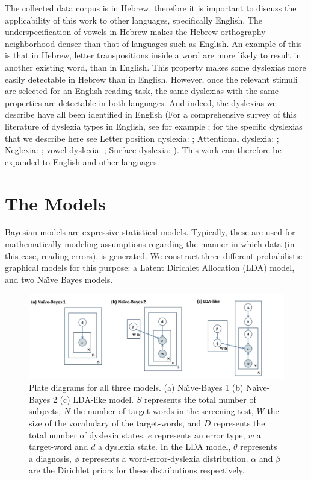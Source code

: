 The collected data corpus is in Hebrew, therefore it is important to discuss the applicability of this work to other languages, specifically English. The underspecification of vowels in Hebrew makes the Hebrew orthography neighborhood denser than that of languages such as English. An example of this is that in Hebrew, letter transpositions inside a word are more likely to result in another existing word, than in English. This property makes some dyslexias more easily detectable in Hebrew than in English. However, once the relevant stimuli are selected for an English reading task, the same dyslexias with the same properties are detectable in both languages. And indeed, the dyslexias we describe have all been identified in English (For a comprehensive survey of this literature of dyslexia types in English, see for example \citealp{ck12}; for the specific dyslexias that we describe here see Letter position dyslexia: \citealp{ck12}; Attentional dyslexia: \citealp{sc98, sw77}; Neglexia: \citealp{vba10}; vowel dyslexia: \citealp{kf11}; Surface dyslexia: \citealp{bd95, cbc06, cc93, c83}). This work can therefore be expanded to English and other languages.  

\section{The Models}
Bayesian models are expressive statistical models. Typically, these are used for mathematically modeling assumptions regarding the manner in which data (in this case, reading errors), is generated. We construct three different probabilistic graphical models for this purpose: a Latent Dirichlet Allocation (LDA) model, and two Na\"{\i}ve Bayes models.

\vfill

\begin{figure}
\vspace{.3in}
\includegraphics[width=\textwidth]{Figures/Ch1/figure_graphical_models}
\caption{Plate diagrams for all three models. (a) Na\"{\i}ve-Bayes 1 (b) Na\"{\i}ve-Bayes 2 (c) LDA-like model. $S$ represents the total number of subjects, $N$ the number of target-words in the screening test, $W$ the size of the vocabulary of the target-words, and $D$ represents the total number of dyslexia states. $e$ represents an error type, $w$ a target-word and $d$ a dyslexia state. In the LDA model, $\theta$ represents a diagnosis, $\phi$ represents a word-error-dyslexia distribution. $\alpha$ and $\beta$ are the Dirichlet priors for these distributions respectively.}
\end{figure}

